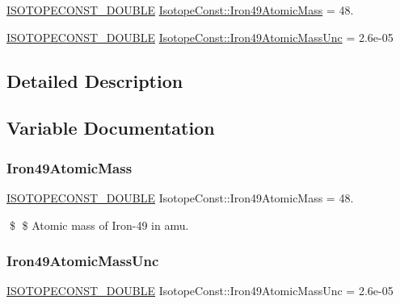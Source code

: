 \begin{DoxyCompactItemize}
\item 
\mbox{\hyperlink{group___isotope_const-_macros_ga8f45a7272ce02c0b4c65c44636ed719a}{I\+S\+O\+T\+O\+P\+E\+C\+O\+N\+S\+T\+\_\+\+D\+O\+U\+B\+LE}} \mbox{\hyperlink{group___isotope_const-_iron-_fe49_gaf6818677dd5d242254cdcbbf65e3e0f1}{Isotope\+Const\+::\+Iron49\+Atomic\+Mass}} = 48.
\item 
\mbox{\hyperlink{group___isotope_const-_macros_ga8f45a7272ce02c0b4c65c44636ed719a}{I\+S\+O\+T\+O\+P\+E\+C\+O\+N\+S\+T\+\_\+\+D\+O\+U\+B\+LE}} \mbox{\hyperlink{group___isotope_const-_iron-_fe49_ga7003d32fe017624554071b367e14d0fd}{Isotope\+Const\+::\+Iron49\+Atomic\+Mass\+Unc}} = 2.\+6e-\/05
\end{DoxyCompactItemize}


\subsection{Detailed Description}


\subsection{Variable Documentation}
\mbox{\label{group___isotope_const-_iron-_fe49_gaf6818677dd5d242254cdcbbf65e3e0f1}} 
\subsubsection{\texorpdfstring{Iron49\+Atomic\+Mass}{Iron49AtomicMass}}
{\footnotesize\ttfamily \mbox{\hyperlink{group___isotope_const-_macros_ga8f45a7272ce02c0b4c65c44636ed719a}{I\+S\+O\+T\+O\+P\+E\+C\+O\+N\+S\+T\+\_\+\+D\+O\+U\+B\+LE}} Isotope\+Const\+::\+Iron49\+Atomic\+Mass = 48.}

\$ \$ Atomic mass of Iron-\/49 in amu. \mbox{\label{group___isotope_const-_iron-_fe49_ga7003d32fe017624554071b367e14d0fd}} 
\subsubsection{\texorpdfstring{Iron49\+Atomic\+Mass\+Unc}{Iron49AtomicMassUnc}}
{\footnotesize\ttfamily \mbox{\hyperlink{group___isotope_const-_macros_ga8f45a7272ce02c0b4c65c44636ed719a}{I\+S\+O\+T\+O\+P\+E\+C\+O\+N\+S\+T\+\_\+\+D\+O\+U\+B\+LE}} Isotope\+Const\+::\+Iron49\+Atomic\+Mass\+Unc = 2.\+6e-\/05}

